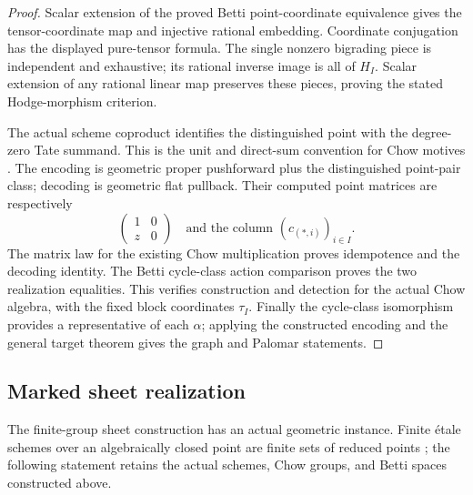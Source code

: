 \documentclass[11pt]{article}
\theoremstyle{definition}
\theoremstyle{remark}
\begin{document}
\begin{proof}
Scalar extension of the proved Betti point-coordinate equivalence gives
the tensor-coordinate map and injective rational embedding.  Coordinate
conjugation has the displayed pure-tensor formula.  The single nonzero
bigrading piece is independent and exhaustive; its rational inverse
image is all of \(H_I\).  Scalar extension of any rational linear map
preserves these pieces, proving the stated Hodge-morphism criterion.

The actual scheme coproduct identifies the distinguished point with the
degree-zero Tate summand.  This is the unit and direct-sum convention for
Chow motives \cite{StacksChowMotiveUnit,StacksChowMotiveDirectSum}.
The encoding is geometric proper pushforward plus the distinguished
point-pair class; decoding is geometric flat pullback.  Their computed
point matrices are respectively
\[
 \begin{pmatrix}1&0\\z&0\end{pmatrix}
 \quad\text{and the column }(c_{(*,i)})_{i\in I}.
\]
The matrix law for the existing Chow multiplication proves idempotence
and the decoding identity.  The Betti cycle-class action comparison
proves the two realization equalities.  This verifies construction and
detection for the actual Chow algebra, with the fixed block coordinates
\(\tau_I\).  Finally the cycle-class isomorphism provides a representative
of each \(\alpha\); applying the constructed encoding and the general
target theorem gives the graph and Palomar statements.
\end{proof}

\subsection{Marked sheet realization}

The finite-group sheet construction has an actual geometric instance.
Finite \'etale schemes over an algebraically closed point are finite sets
of reduced points \cite{StacksFiniteEtaleAlgebraicallyClosed}; the
following statement retains the actual schemes, Chow groups, and Betti
spaces constructed above.
\end{document}
